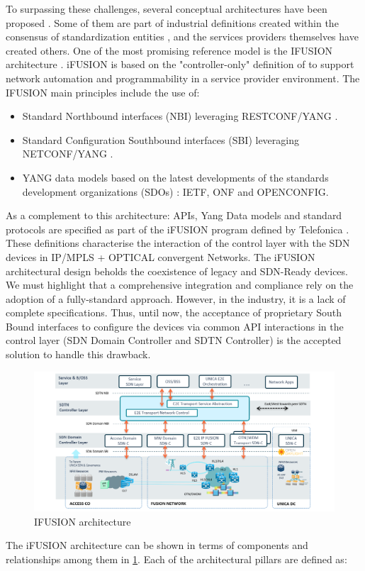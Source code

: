 \documentclass[a4paper,fleqn]{cas-dc}
\begin{document}
To surpassing these challenges, several conceptual architectures have been proposed \cite{vissicchio2014opportunities,vissicchio2017safe}. Some of them are part of industrial definitions created within the consensus of standardization entities \cite{lee2015requirements}, and the services providers themselves have created others. One of the most promising reference model is the \uppercase{iFUSION} architecture \cite{contreras2019ifusion}. iFUSION is based on the "controller-only" definition of \cite{sinha2017survey} to support network automation and programmability in a service provider environment. The \uppercase{iFUSION} main principles include the use of:
\begin{itemize}
    \item Standard Northbound interfaces (NBI) leveraging \uppercase{RESTconf/YANG} \cite{bierman2017restconf}.
    \item Standard Configuration Southbound interfaces (SBI) leveraging \uppercase{NETCONF/YANG} \cite{enns2011network}.
    \item YANG data models based on the latest developments of the standards development organizations (SDOs) \cite{bjorklund2016yang}: \uppercase{IETF}, \uppercase{ONF} and \uppercase{OpenConfig}.
\end{itemize}

As a complement to this architecture: APIs, Yang Data models and standard protocols are specified as part of the i\uppercase{FUSION} program  defined by Telefonica \cite{apistelefonica}. These definitions characterise the interaction of the control layer with the SDN devices in IP/MPLS + OPTICAL convergent Networks. 
The iFUSION architectural design beholds the coexistence of legacy and SDN-Ready devices. We must highlight that a comprehensive integration and compliance rely on the adoption of a fully-standard approach. However,  in the industry, it is a lack of complete specifications. Thus, until now, the acceptance of proprietary South Bound interfaces to configure the devices via common API interactions in the control layer (SDN Domain Controller and SDTN Controller) is the accepted solution to handle this drawback.

\begin{figure}
	\centering
		\includegraphics[width=\linewidth]{figs/ifusion_architecture.png}
	\caption{\uppercase{iFUSION} architecture}
	\label{FIG:1}
\end{figure}
The i\uppercase{FUSION} architecture can be shown in terms of components and relationships among them in \cref{FIG:1}. Each of the architectural pillars are defined as:
\end{document}
